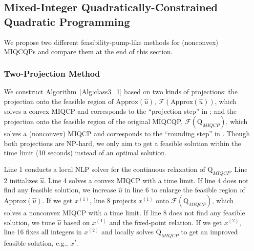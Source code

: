 \documentclass[]{article}
\begin{document}
\subsection{Mixed-Integer Quadratically-Constrained Quadratic Programming}
\label{sec:MIQCQPproj}
We propose two different feasibility-pump-like methods for (nonconvex) MIQCQPs and compare them at the end of this section.

\subsubsection{Two-Projection Method} 

We construct Algorithm~\ref{Alg:class3_1} based on two kinds of projections: the projection onto the feasible region of $\mbox{Approx}(\hat{u})$, $\mathcal{F}(\mbox{Approx}(\hat{u}))$, which solves a convex MIQCP and corresponds to the ``projection step'' in \cite{bonami2012heuristics}; and the projection onto the feasible region of the original MIQCQP, $\mathcal{F}(\mathrm{Q}_{MIQCP})$, which solves a (nonconvex) MIQCP and corresponds to the ``rounding step'' in \cite{bonami2009feasibility}. Though both projections are NP-hard, we only aim to get a feasible solution within the time limit (10 seconds) instead of an optimal solution.

Line 1 conducts a local NLP solver for the continuous relaxation of $\mathrm{Q}_{MIQCP}$. Line 2 initializes $\hat{u}$. Line 4 solves a convex MIQCP with a time limit. If line 4 does not find any feasible solution, we increase $\hat{u}$ in line 6 to enlarge the feasible region of $\mbox{Approx}(\hat{u})$. If we get $x^{(1)}$, line 8 projects $x^{(1)}$ onto $\mathcal{F}(\mathrm{Q}_{MIQCP})$, which solves a nonconvex MIQCP with a time limit. If line 8 does not find any feasible solution, we tune $\hat{u}$ based on $x^{(1)}$ and the fixed-point relation. If we get $x^{(2)}$, line 16 fixes all integers in $x^{(2)}$ and locally solves $\mathrm{Q}_{MIQCP}$ to get an improved feasible solution, e.g., $x^*$.
\end{document}
